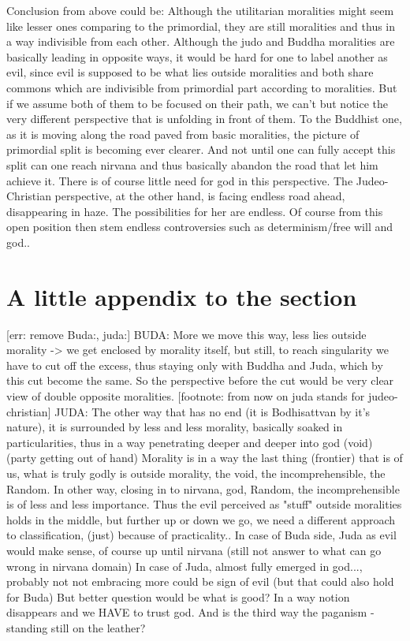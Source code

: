\documentclass[10pt]{book}
\begin{document}
Conclusion from above could be: Although the utilitarian moralities might seem like lesser ones comparing to the primordial, they are still moralities and thus in a way indivisible from each other. Although the judo and Buddha moralities are basically leading in opposite ways, it would be hard for one to label another as evil, since evil is supposed to be what lies outside moralities and both share commons which are indivisible from primordial part according to moralities. 
But if we assume both of them to be focused on their path, we can't but notice the very different perspective that is unfolding in front of them. To the Buddhist one, as it is moving along the road paved from basic moralities, the picture of primordial split is becoming ever clearer. And not until one can fully accept this split can one reach nirvana and thus basically abandon the road that let him achieve it. There is of course little need for god in this perspective.
The Judeo-Christian perspective, at the other hand, is facing endless road ahead, disappearing in haze. The possibilities for her are endless. Of course from this open position then stem endless controversies such as determinism/free will and god..  

\section{A little appendix to the section}

[err: remove Buda:, juda:]
BUDA: More we move this way, less lies outside morality -> we get enclosed by morality itself, but still, to reach singularity we have to cut off the excess, thus staying only with Buddha and Juda, which by this cut become the same. So the perspective before the cut would be very clear view of double opposite moralities.
[footnote: from now on juda stands for judeo-christian] JUDA: The other way that has no end (it is Bodhisattvan by it's nature), it is surrounded by less and less morality, basically soaked in particularities, thus in a way penetrating deeper and deeper into god (void) (party getting out of hand)
Morality is in a way the last thing (frontier) that is of us, what is truly godly is outside morality, the void, the incomprehensible, the Random. In other way, closing in to nirvana, god, Random, the incomprehensible is of less and less importance. 
Thus the evil perceived as "stuff" outside moralities holds in the middle, but further up or down we go, we need a different approach to classification, (just) because of practicality.. In case of Buda side, Juda as evil would make sense, of course up until nirvana (still not answer to what can go wrong in nirvana domain) In case of Juda, almost fully emerged in god..., probably not not embracing more could be sign of evil (but that could also hold for Buda) But better question would be what is good? In a way notion disappears and we HAVE to trust god.
And is the third way the paganism - standing still on the leather?
\end{document}
